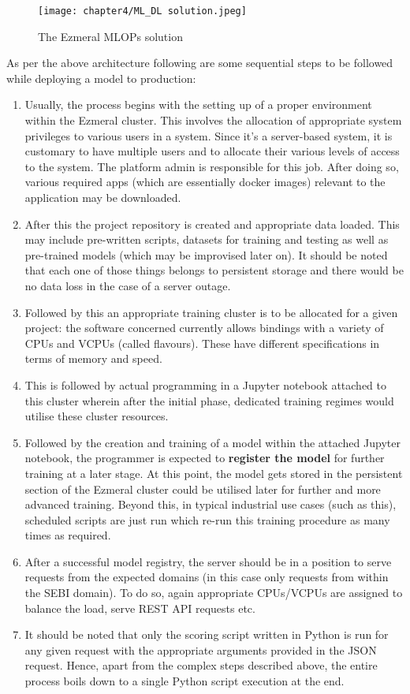 \begin{figure}[h]
  \centering
  \texttt{[image: chapter4/ML\_DL solution.jpeg]}
  \caption{The Ezmeral MLOPs solution}
  \label{fig:ml_dl_sol}
\end{figure}

As per the above architecture following are some sequential steps to be followed while deploying a model to production: \cite{Chiang2020}

\begin{enumerate}
\item Usually, the process begins with the setting up of a proper environment within the Ezmeral cluster. This involves the allocation of appropriate system privileges to various users in a system. Since it’s a server-based system, it is customary to have multiple users and to allocate their various levels of access to the system. The platform admin is responsible for this job. After doing so, various required apps (which are essentially docker images) relevant to the application may be downloaded.
\item After this the project repository is created and appropriate data loaded. This may include pre-written scripts, datasets for training and testing as well as pre-trained models (which may be improvised later on). It should be noted that each one of those things belongs to persistent storage and there would be no data loss in the case of a server outage.
\item Followed by this an appropriate training cluster is to be allocated for a given project: the software concerned currently allows bindings with a variety of CPUs and VCPUs (called flavours). These have different specifications in terms of memory and speed.
\item  This is followed by actual programming in a Jupyter notebook attached to this cluster wherein after the initial phase, dedicated training regimes would utilise these cluster resources.
\item  Followed by the creation and training of a model within the attached Jupyter notebook, the programmer is expected to \textbf{register the model} for further training at a later stage. At this point, the model gets stored in the persistent section of the Ezmeral cluster could be utilised later for further and more advanced training. Beyond this, in typical industrial use cases (such as this), scheduled scripts are just run which re-run this training procedure as many times as required.
\item  After a successful model registry, the server should be in a position to serve requests from the expected domains (in this case only requests from within the SEBI domain). To do so, again appropriate CPUs/VCPUs are assigned to balance the load, serve REST API requests etc.
\item It should be noted that only the scoring script written in Python is run for any given request with the appropriate arguments provided in the JSON request. Hence, apart from the complex steps described above, the entire process boils down to a single Python script execution at the end. \par


\end{enumerate}
